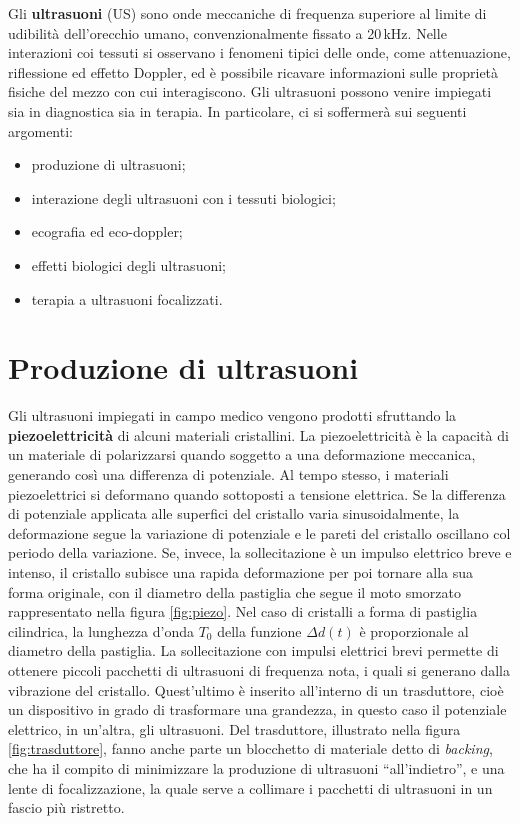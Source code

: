 \documentclass{report}
\newcommand{\virgolette}[1]{``#1''}
\newcommand{\figref}[1]{figura \ref{#1}}
\numberwithin{equation}{section}
\numberwithin{figure}{section}
\begin{document}
Gli \textbf{ultrasuoni} (US) sono onde meccaniche di frequenza superiore al limite di udibilità dell'orecchio umano, convenzionalmente fissato a 20\,kHz. Nelle interazioni coi tessuti si osservano i fenomeni tipici delle onde, come attenuazione, riflessione ed effetto Doppler, ed è possibile ricavare informazioni sulle proprietà fisiche del mezzo con cui interagiscono. Gli ultrasuoni possono venire impiegati sia in diagnostica sia in terapia. In particolare, ci si soffermerà sui seguenti argomenti:
\begin{itemize}[label=$-$]
    \item produzione di ultrasuoni;
    \item interazione degli ultrasuoni con i tessuti biologici;
    \item ecografia ed eco-doppler;
    \item effetti biologici degli ultrasuoni;
    \item terapia a ultrasuoni focalizzati.
\end{itemize}

\section{Produzione di ultrasuoni}
Gli ultrasuoni impiegati in campo medico vengono prodotti sfruttando la \textbf{piezoelettricità} di alcuni materiali cristallini. La piezoelettricità è la capacità di un materiale di polarizzarsi quando soggetto a una deformazione meccanica, generando così una differenza di potenziale. Al tempo stesso, i materiali piezoelettrici si deformano quando sottoposti a tensione elettrica. Se la differenza di potenziale applicata alle superfici del cristallo varia sinusoidalmente, la deformazione segue la variazione di potenziale e le pareti del cristallo oscillano col periodo della variazione. Se, invece, la sollecitazione è un impulso elettrico breve e intenso, il cristallo subisce una rapida deformazione per poi tornare alla sua forma originale, con il diametro della pastiglia che segue il moto smorzato rappresentato nella \figref{fig:piezo}. Nel caso di cristalli a forma di pastiglia cilindrica, la lunghezza d'onda $T_0$ della funzione $\Delta d(t)$ è proporzionale al diametro della pastiglia. La sollecitazione con impulsi elettrici brevi permette di ottenere piccoli pacchetti di ultrasuoni di frequenza nota, i quali si generano dalla vibrazione del cristallo. Quest'ultimo è inserito all'interno di un trasduttore, cioè un dispositivo in grado di trasformare una grandezza, in questo caso il potenziale elettrico, in un'altra, gli ultrasuoni. Del trasduttore, illustrato nella \figref{fig:trasduttore}, fanno anche parte un blocchetto di materiale detto di \textit{backing}, che ha il compito di minimizzare la produzione di ultrasuoni \virgolette{all'indietro}, e una lente di focalizzazione, la quale serve a collimare i pacchetti di ultrasuoni in un fascio più ristretto.
\end{document}
